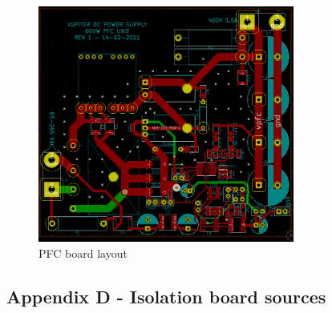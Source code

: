 \documentclass[15pt]{article}
\begin{document}
\begin{figure}[H]
    \centering
        \includegraphics[width=0.75\textwidth]{pfclayout}
        \caption{PFC board layout}
        \label{fig:pfclayout}
    \centering
\end{figure}

\subsection{Appendix D - Isolation board sources}
\end{document}
